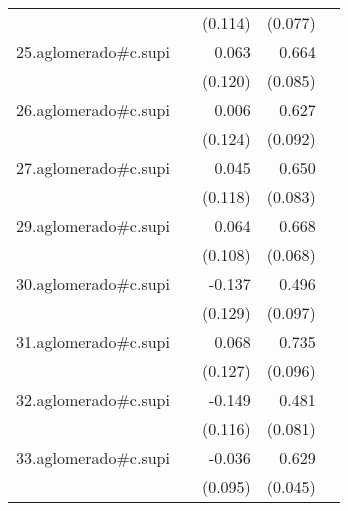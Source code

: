 {\begin{longtable}{l*{4}{D{.}{.}{-1}}}
            &                     &     (0.114)         &     (0.077)         &                     \\
\addlinespace
25.aglomerado#c.supi&                     &       0.063         &       0.664\sym{***}&                     \\
            &                     &     (0.120)         &     (0.085)         &                     \\
\addlinespace
26.aglomerado#c.supi&                     &       0.006         &       0.627\sym{***}&                     \\
            &                     &     (0.124)         &     (0.092)         &                     \\
\addlinespace
27.aglomerado#c.supi&                     &       0.045         &       0.650\sym{***}&                     \\
            &                     &     (0.118)         &     (0.083)         &                     \\
\addlinespace
29.aglomerado#c.supi&                     &       0.064         &       0.668\sym{***}&                     \\
            &                     &     (0.108)         &     (0.068)         &                     \\
\addlinespace
30.aglomerado#c.supi&                     &      -0.137         &       0.496\sym{***}&                     \\
            &                     &     (0.129)         &     (0.097)         &                     \\
\addlinespace
31.aglomerado#c.supi&                     &       0.068         &       0.735\sym{***}&                     \\
            &                     &     (0.127)         &     (0.096)         &                     \\
\addlinespace
32.aglomerado#c.supi&                     &      -0.149         &       0.481\sym{***}&                     \\
            &                     &     (0.116)         &     (0.081)         &                     \\
\addlinespace
33.aglomerado#c.supi&                     &      -0.036         &       0.629\sym{***}&                     \\
            &                     &     (0.095)         &     (0.045)         &                     \\

\end{longtable}}

